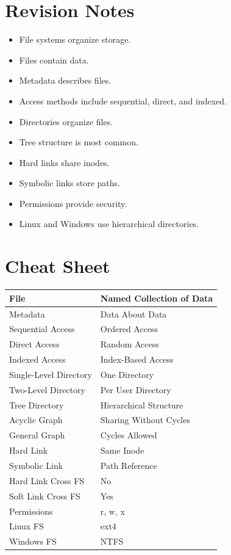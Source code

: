 \section{Revision Notes}

\begin{itemize}
\item File systems organize storage.
\item Files contain data.
\item Metadata describes files.
\item Access methods include sequential, direct, and indexed.
\item Directories organize files.
\item Tree structure is most common.
\item Hard links share inodes.
\item Symbolic links store paths.
\item Permissions provide security.
\item Linux and Windows use hierarchical directories.
\end{itemize}

\section{Cheat Sheet}

\begin{center}
\begin{tabular}{|p{5cm}|p{8cm}|}
\hline
File & Named Collection of Data \\
\hline
Metadata & Data About Data \\
\hline
Sequential Access & Ordered Access \\
\hline
Direct Access & Random Access \\
\hline
Indexed Access & Index-Based Access \\
\hline
Single-Level Directory & One Directory \\
\hline
Two-Level Directory & Per User Directory \\
\hline
Tree Directory & Hierarchical Structure \\
\hline
Acyclic Graph & Sharing Without Cycles \\
\hline
General Graph & Cycles Allowed \\
\hline
Hard Link & Same Inode \\
\hline
Symbolic Link & Path Reference \\
\hline
Hard Link Cross FS & No \\
\hline
Soft Link Cross FS & Yes \\
\hline
Permissions & r, w, x \\
\hline
Linux FS & ext4 \\
\hline
Windows FS & NTFS \\
\hline
\end{tabular}
\end{center}